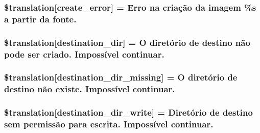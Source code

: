 \subsubsection[{\$translation}]{\setlength{\rightskip}{0pt plus 5cm}\$translation\mbox{[}\textquotesingle{}create\+\_\+error\textquotesingle{}\mbox{]} = \textquotesingle{}Erro na criação da imagem \%s a partir da fonte.\textquotesingle{}}\label{class_8upload_8pt___b_r_8php_a53013ce9255c4e1849098ddd9fdb2b3f}
\hypertarget{class_8upload_8pt___b_r_8php_aff2427c72a2598aefa6d58df1dd18b08}{}
\subsubsection[{\$translation}]{\setlength{\rightskip}{0pt plus 5cm}\$translation\mbox{[}\textquotesingle{}destination\+\_\+dir\textquotesingle{}\mbox{]} = \textquotesingle{}O diretório de destino não pode ser criado. Impossível continuar.\textquotesingle{}}\label{class_8upload_8pt___b_r_8php_aff2427c72a2598aefa6d58df1dd18b08}
\hypertarget{class_8upload_8pt___b_r_8php_a9ef28d3cf09942c6c0a1e77fa09185e8}{}
\subsubsection[{\$translation}]{\setlength{\rightskip}{0pt plus 5cm}\$translation\mbox{[}\textquotesingle{}destination\+\_\+dir\+\_\+missing\textquotesingle{}\mbox{]} = \textquotesingle{}O diretório de destino não existe. Impossível continuar.\textquotesingle{}}\label{class_8upload_8pt___b_r_8php_a9ef28d3cf09942c6c0a1e77fa09185e8}
\hypertarget{class_8upload_8pt___b_r_8php_a97608ea194a616db49141a0e6dee900c}{}
\subsubsection[{\$translation}]{\setlength{\rightskip}{0pt plus 5cm}\$translation\mbox{[}\textquotesingle{}destination\+\_\+dir\+\_\+write\textquotesingle{}\mbox{]} = \textquotesingle{}Diretório de destino sem permissão para escrita. Impossível continuar.\textquotesingle{}}\label{class_8upload_8pt___b_r_8php_a97608ea194a616db49141a0e6dee900c}
\hypertarget{class_8upload_8pt___b_r_8php_a5704a67137126e8c87b7a364175929d4}{}
